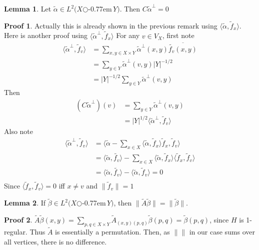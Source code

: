 \documentclass{book}
\newcommand{\zigzag}{$\bigcirc$\kern-0.77em\raisebox{-.16ex}{\small Z}$\,$}
\newcommand{\inner}[1]{\langle #1 \rangle}
\newcommand{\norm}[1]{\lVert #1 \rVert}
\newcommand{\abs}[1]{\lvert #1 \rvert }
\theoremstyle{definition}
\newtheorem{lemma}{Lemma}[chapter]
\theoremstyle{remarkstyle}
\newtheorem*{myproof}{Proof}%
\begin{document}
\begin{lemma}
    Let $\tilde{\alpha}\in L^{2}(X$\zigzag$Y)$. Then $C\tilde{\alpha}^{\perp}=0 $
\end{lemma}
\begin{myproof}
    Actually this is already shown in the previous remark using $\inner{\tilde{\alpha}, \tilde{f}_x }$. Here is another proof using $\inner{\tilde{\alpha}^{\perp} , \tilde{f}_x }$\newline
    For any $v\in V_X$, first note 
    \begin{align*}
        \inner{\tilde{\alpha}^{\perp}, \tilde{f}_v } 
        &= \sum_{x,y\in X\times Y}\tilde{\alpha}^{\perp}(x,y)\overline{\tilde{f_v}(x,y)} \\
        &= \sum_{y\in Y}\tilde{\alpha}^{\perp}(v,y)\abs{Y}^{-1/2} \\
        &= \abs{Y}^{-1/2}\sum_{y\in Y}\tilde{\alpha}^{\perp}(v,y)
    \end{align*}
    Then
    \begin{align*}
        (C\tilde{\alpha}^{\perp})(v) 
        &= \sum_{y\in Y}\tilde{\alpha}^{\perp}(v,y) \\
        &= \abs{Y}^{1/2}\inner{\tilde{\alpha}^{\perp}, \tilde{f}_v } 
    \end{align*}
    Also note
    \begin{align*}
        \inner{\tilde{\alpha}^{\perp}, \tilde{f}_v } 
        &= \inner{\tilde{\alpha} - \sum_{x\in X}\inner{\tilde{\alpha},\tilde{f}_x}\tilde{f}_x, \tilde{f}_v } \\
        &= \inner{\tilde{\alpha}, \tilde{f_v} } - \sum_{x\in X}\inner{\tilde{\alpha}, \tilde{f}_x }\inner{\tilde{f}_x,\tilde{f}_v} \\
        &= \inner{\tilde{\alpha}, \tilde{f_v} } - \inner{\tilde{\alpha}, \tilde{f}_v } = 0 \\
    \end{align*}
    Since $\inner{\tilde{f}_x,\tilde{f}_v } = 0$ iff $x\neq v$ and $\norm{\tilde{f}_v}=1$
    \newline
\end{myproof}

\begin{lemma}
    If $\tilde{\beta}\in L^{2}(X$\zigzag$Y)$, then $\norm{\tilde{A}\tilde{\beta}}=\norm{\tilde{\beta}}$.
\end{lemma}
\begin{myproof}
    $\tilde{A}\tilde{\beta}(x,y) = \sum_{p,q\in X\times Y}\tilde{A}_{(x,y)(p,q)}\tilde{\beta}(p,q) = \tilde{\beta}(p,q)$, since $H$ is 1-regular. Thus $\tilde{A}$ is essentially a permutation. Then, as $\norm{}$ in our case sums over all vertices, there is no difference. \newline
\end{myproof}
\end{document}
